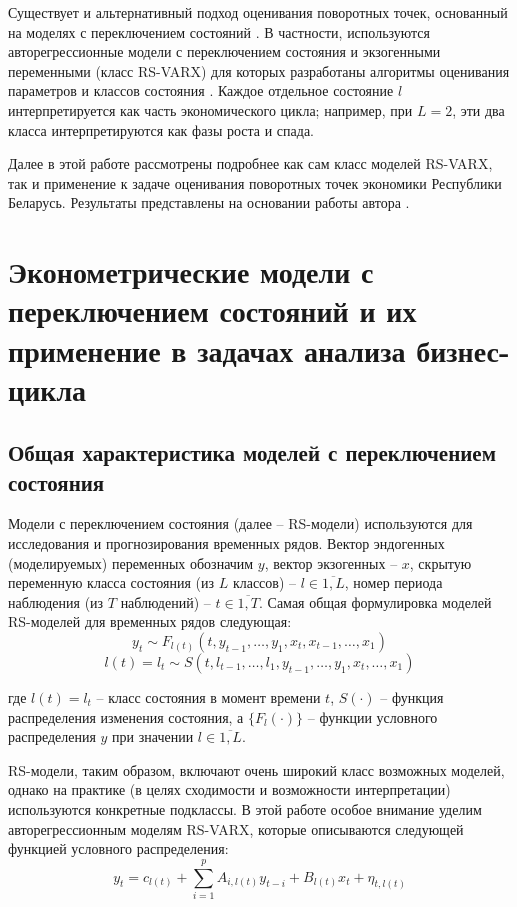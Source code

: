 \documentclass[a4paper,14pt]{extreport}
\begin{document}
Существует и альтернативный подход оценивания поворотных точек, основанный на моделях с переключением состояний \cite{hamNewApproach}. В частности, используются авторегрессионные модели с переключением состояния и экзогенными переменными (класс RS-VARX) для которых разработаны алгоритмы оценивания параметров и классов состояния \cite{malNovopMSVARX,rs_persio2014,goutte_hal_00747479}. Каждое отдельное состояние $l$ интерпретируется как часть экономического цикла; например, при $L=2$, эти два класса интерпретируются как фазы роста и спада. 

Далее в этой работе рассмотрены подробнее как сам класс моделей RS-VARX, так и применение к задаче оценивания поворотных точек экономики Республики Беларусь. Результаты представлены на основании работы автора \cite{mak_mal_bv_2020}.


\chapter{Эконометрические модели с переключением состояний и их применение в задачах анализа бизнес-цикла}


\section{Общая характеристика моделей с переключением состояния}
Модели с переключением состояния (далее – RS-модели) используются для исследования и прогнозирования временных рядов. Вектор эндогенных (моделируемых) переменных обозначим $y$, вектор экзогенных -- $x$, скрытую переменную класса состояния (из $L$ классов) -- $l \in \overline{1, L}$, номер периода наблюдения (из $T$ наблюдений) -- $t \in \overline{1,T}$.
Самая общая формулировка моделей RS-моделей для временных рядов следующая:
\[
	y_t \sim F_{l(t)}(t, y_{t-1}, \dots, y_1, x_t, x_{t-1}, \dots, x_1) 
\]
\[
	l(t) = l_t \sim S(t, l_{t-1}, \dots, l_1, y_{t-1}, \dots, y_1, x_t, \dots, x_1) 
\]

где $l(t) = l_t$ -- класс состояния в момент времени $t$, $S(\cdot)$ -- функция распределения изменения состояния, а $\{F_l(\cdot)\}$ -- функции условного распределения $y$ при значении $l \in \overline{1,L}$. 

RS-модели, таким образом, включают очень широкий класс возможных моделей, однако на практике (в целях сходимости и возможности интерпретации) используются конкретные подклассы. В этой работе особое внимание уделим авторегрессионным моделям RS-VARX, которые описываются следующей функцией условного распределения:
\[
	y_{t}=c_{l(t)} + \sum_{i=1}^{p} A_{i,l(t)} y_{t-i} + B_{l(t)} x_{t} + \eta_{t, l(t)}
\]
\end{document}
